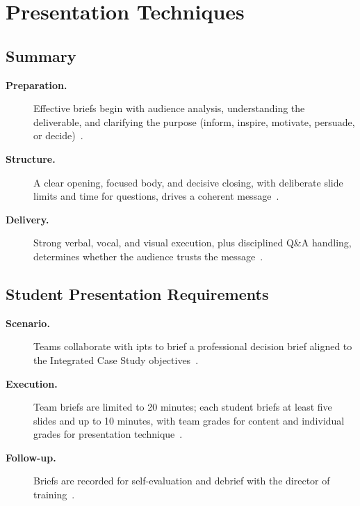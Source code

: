 \documentclass[../main.tex]{subfiles}
\begin{document}
\section{Presentation Techniques}

\subsection{Summary}
\begin{description}
  \item[\textbf{Preparation.}] Effective briefs begin with audience analysis, understanding the deliverable, and clarifying the purpose (inform, inspire, motivate, persuade, or decide)~\autocite{edo-5-1-4-presentation-techniques-2025}.
  \item[\textbf{Structure.}] A clear opening, focused body, and decisive closing, with deliberate slide limits and time for questions, drives a coherent message~\autocite{edo-5-1-4-presentation-techniques-2025}.
  \item[\textbf{Delivery.}] Strong verbal, vocal, and visual execution, plus disciplined Q\&A handling, determines whether the audience trusts the message~\autocite{edo-5-1-4-presentation-techniques-2025}.
\end{description}

\subsection{Student Presentation Requirements}
\begin{description}
  \item[\textbf{Scenario.}] Teams collaborate with \acp{ipt} to brief a professional decision brief aligned to the Integrated Case Study objectives~\autocite{edo-5-1-4-presentation-techniques-2025}.
  \item[\textbf{Execution.}] Team briefs are limited to 20 minutes; each student briefs at least five slides and up to 10 minutes, with team grades for content and individual grades for presentation technique~\autocite{edo-5-1-4-presentation-techniques-2025}.
  \item[\textbf{Follow-up.}] Briefs are recorded for self-evaluation and debrief with the director of training~\autocite{edo-5-1-4-presentation-techniques-2025}.
\end{description}
\end{document}
